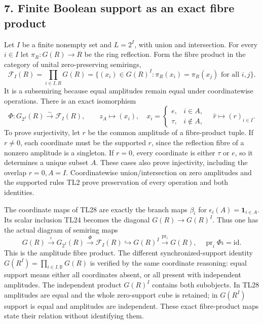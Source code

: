\subsection{7. Finite Boolean support as an exact fibre
product}\label{finite-boolean-support-as-an-exact-fibre-product}

Let \(I\) be a finite nonempty set and \(L=2^I\), with union and
intersection. For every \(i\in I\) let \(\pi_R:G(R)\to R\) be the ring
reflection. Form the fibre product in the category of unital
zero-preserving semirings, \[
 \mathcal F_I(R)=\prod_{i\in I,R}G(R)
 =\{(x_i)\in G(R)^I:\pi_R(x_i)=\pi_R(x_j)\text{ for all }i,j\}.
 \tag{TL27}
\] It is a subsemiring because equal amplitudes remain equal under
coordinatewise operations. There is an exact isomorphism \[
 \boxed{\Phi:G_{2^I}(R)\xrightarrow{\sim}\mathcal F_I(R),\qquad
 z_A\mapsto(x_i),\quad x_i=
 \begin{cases}e,&i\in A,\\\tau,&i\notin A,\end{cases}
 \quad\widehat r\mapsto(r)_{i\in I}.}
 \tag{TL28}
\] To prove surjectivity, let \(r\) be the common amplitude of a
fibre-product tuple. If \(r\ne0\), each coordinate must be the supported
\(r\), since the reflection fibre of a nonzero amplitude is a singleton.
If \(r=0\), every coordinate is either \(\tau\) or \(e\), so it
determines a unique subset \(A\). These cases also prove injectivity,
including the overlap \(r=0,A=I\). Coordinatewise union/intersection on
zero amplitudes and the supported rules TL2 prove preservation of every
operation and both identities.

The coordinate maps of TL28 are exactly the branch maps \(\beta_i\) for
\(\epsilon_i(A)=\mathbf1_{i\in A}\). Its scalar inclusion TL24 becomes
the diagonal \(G(R)\to G(R)^I\). Thus one has the actual diagram of
semiring maps \[
 G(R)\xrightarrow{\iota}G_{2^I}(R)
 \xrightarrow{\Phi}\mathcal F_I(R)\hookrightarrow G(R)^I
 \xrightarrow{\operatorname{pr}_i}G(R),
 \quad\operatorname{pr}_i\Phi\iota=\mathrm{id}.
 \tag{TL29}
\] This is the amplitude fibre product. The different
synchronized-support identity \(G(R^I)=\prod_{i\in I,\mathbb B}G(R)\) is
verified by the same coordinate reasoning: equal support means either
all coordinates absent, or all present with independent amplitudes. The
independent product \(G(R)^I\) contains both subobjects. In TL28
amplitudes are equal and the whole zero-support cube is retained; in
\(G(R^I)\) support is equal and amplitudes are independent. These exact
fibre-product maps state their relation without identifying them.

